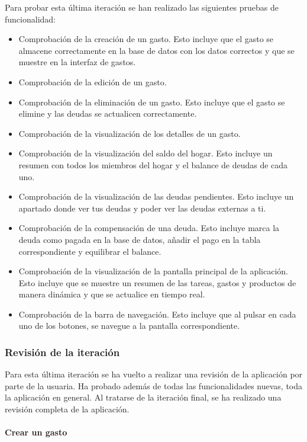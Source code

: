 Para probar esta última iteración se han realizado las siguientes pruebas de funcionalidad:
\begin{itemize}
    \item Comprobación de la creación de un gasto. Esto incluye que el gasto se almacene correctamente en la base de datos con los datos correctos y que se muestre en la interfaz de gastos.
    \item Comprobación de la edición de un gasto.
    \item Comprobación de la eliminación de un gasto. Esto incluye que el gasto se elimine y las deudas se actualicen correctamente.
    \item Comprobación de la visualización de los detalles de un gasto.
    \item Comprobación de la visualización del saldo del hogar. Esto incluye un resumen con todos los miembros del hogar y el balance de deudas de cada uno.
    \item Comprobación de la visualización de las deudas pendientes. Esto incluye un apartado donde ver tus deudas y poder ver las deudas externas a ti.
    \item Comprobación de la compensación de una deuda. Esto incluye marca la deuda como pagada en la base de datos, añadir el pago en la tabla correspondiente y equilibrar el balance. 
    \item Comprobación de la visualización de la pantalla principal de la aplicación. Esto incluye que se muestre un resumen de las tareas, gastos y productos de manera dinámica y que se actualice en tiempo real. 
    \item Comprobación de la barra de navegación. Esto incluye que al pulsar en cada uno de los botones, se navegue a la pantalla correspondiente.
\end{itemize}

\subsubsection{Revisión de la iteración}

Para esta última iteración se ha vuelto a realizar una revisión de la aplicación por parte de la usuaria. Ha probado 
además de todas las funcionalidades nuevas, toda la aplicación en general. Al tratarse de la iteración final, se ha realizado una 
revisión completa de la aplicación.

\paragraph{Crear un gasto}
\parbox{\textwidth}{ 
   
}

